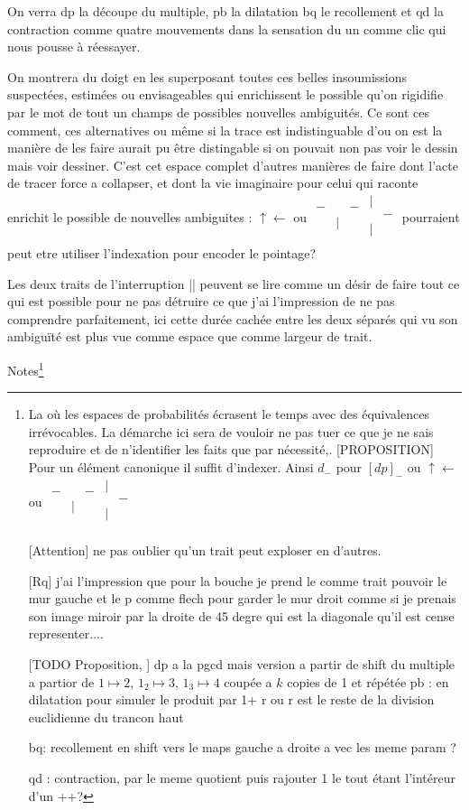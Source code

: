 \documentclass{article}
\newcommand{\dmat}{\scriptscriptstyle\begin{matrix}
|&   \\
  & - \\
 | &   \\
\end{matrix}}
\newcommand{\pmat}{\scriptscriptstyle\begin{matrix}
&  & \\
 - &&  -\\
  &|&  \\
\end{matrix}}
\newcommand{\qmat}{\scriptscriptstyle\begin{matrix}
& |&  \\
  -&&-  \\
  &&   \\
\end{matrix}}
\begin{document}
On verra   dp la découpe du multiple, pb la dilatation bq le recollement et qd la contraction comme quatre mouvements dans la sensation du un comme clic qui nous pousse à réessayer.
 
 On montrera du doigt en les superposant toutes ces belles  insoumissions suspectées, estimées ou envisageables qui enrichissent le possible qu'on rigidifie par le mot de tout un champs de possibles nouvelles ambiguités. Ce sont ces comment, ces alternatives  ou même si la trace est indistinguable d'ou on est  la manière de les faire aurait pu être  distingable si on pouvait non pas voir le dessin mais voir dessiner.
 C'est cet espace complet d'autres  manières de faire dont l'acte de tracer  force a collapser, et dont la vie imaginaire pour celui qui raconte  enrichit le possible de nouvelles ambiguites : $ \uparrow \leftarrow$ ou $ \pmat \dmat$ pourraient peut etre utiliser l'indexation pour encoder le pointage?
 
 Les deux traits de l'interruption || peuvent se lire comme un désir de faire tout ce qui est possible pour ne pas détruire  ce que j'ai l'impression de ne pas comprendre parfaitement, ici  cette durée cachée entre les deux séparés qui vu son ambiguïté est plus vue  comme espace que comme largeur de trait.
  
 Notes\footnote{ La où les espaces de probabilités écrasent le temps avec des équivalences irrévocables. La démarche ici sera  de vouloir ne pas tuer ce que je ne sais reproduire et de n'identifier les faits que par nécessité,.
 [PROPOSITION] Pour un élément canonique il suffit d'indexer. Ainsi $d_-$ pour $[dp]_-$   ou  $ \uparrow \leftarrow$ ou $ \pmat \dmat$ 

 [Attention] ne pas oublier qu'un trait peut exploser en d'autres.
 
[Rq] j'ai l'impression que pour la bouche je prend le comme trait pouvoir le mur gauche et le p comme flech pour garder le mur droit  comme si je prenais son image miroir par la droite de 45 degre qui est la diagonale qu'il est cense representer....

 [TODO Proposition, ] dp a la pgcd mais version a partir de shift du multiple a partior de  $1\mapsto 2$, $ 1_2 \mapsto 3$, $ 1_3 \mapsto 4$ coupée a $k$ copies de 1 et répétée  
 pb : en dilatation pour simuler le produit par 1+ r ou r est le reste de la division euclidienne du trancon haut
 
 bq: recollement en shift vers le maps gauche a droite a vec les meme param ?
 
 qd : contraction, par le meme quotient 
 puis rajouter 1 le tout étant l'intéreur d'un ++?
 }
 
\end{document}
